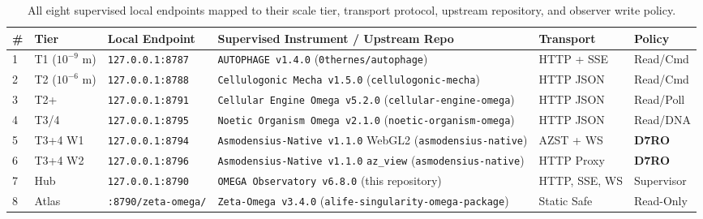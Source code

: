 \documentclass[11pt,reqno]{amsart}
\theoremstyle{definition}
\newcommand{\tcode}[1]{{\scriptsize\nolinkurl{#1}}}
\begin{document}
\begin{table}[t]
\centering
\caption{All eight supervised local endpoints mapped to their scale tier, transport protocol, upstream repository, and observer write policy.}
\label{tab:endpoints}
\scriptsize
\setlength{\tabcolsep}{3.5pt}
\renewcommand{\arraystretch}{1.15}
\begin{tabularx}{\textwidth}{@{}P{0.4cm}P{1.55cm}P{2.35cm}YP{1.75cm}P{1.65cm}@{}}
\toprule
\textbf{\#} & \textbf{Tier} & \textbf{Local Endpoint} & \textbf{Supervised Instrument / Upstream Repo} & \textbf{Transport} & \textbf{Policy} \\
 & T1 ($10^{-9}\text{ m}$) & \tcode{127.0.0.1:8787} & \tcode{AUTOPHAGE v1.4.0} (\tcode{0thernes/autophage}) & HTTP + SSE & Read/Cmd \\
2 & T2 ($10^{-6}\text{ m}$) & \tcode{127.0.0.1:8788} & \tcode{Cellulogonic Mecha v1.5.0} (\tcode{cellulogonic-mecha}) & HTTP JSON & Read/Cmd \\
3 & T2+ & \tcode{127.0.0.1:8791} & \tcode{Cellular Engine Omega v5.2.0} (\tcode{cellular-engine-omega}) & HTTP JSON & Read/Poll \\
4 & T3/4 & \tcode{127.0.0.1:8795} & \tcode{Noetic Organism Omega v2.1.0} (\tcode{noetic-organism-omega}) & HTTP JSON & Read/DNA \\
5 & T3+4 W1 & \tcode{127.0.0.1:8794} & \tcode{Asmodensius-Native v1.1.0} WebGL2 (\tcode{asmodensius-native}) & AZST + WS & \textbf{D7RO} \\
6 & T3+4 W2 & \tcode{127.0.0.1:8796} & \tcode{Asmodensius-Native v1.1.0} \tcode{az\_view} (\tcode{asmodensius-native}) & HTTP Proxy & \textbf{D7RO} \\
7 & Hub & \tcode{127.0.0.1:8790} & \tcode{OMEGA Observatory v6.8.0} (this repository) & HTTP, SSE, WS & Supervisor \\
8 & Atlas & \tcode{:8790/zeta-omega/} & \tcode{Zeta-Omega v3.4.0} (\tcode{alife-singularity-omega-package}) & Static Safe & Read-Only \\
\bottomrule
\end{tabularx}
\end{table}
\end{document}
